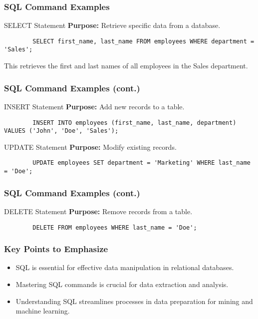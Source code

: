\documentclass[aspectratio=169]{beamer}
\begin{document}
\begin{frame}[fragile]
    \frametitle{SQL Command Examples}
    \begin{block}{SELECT Statement}
        \textbf{Purpose:} Retrieve specific data from a database.
        \begin{lstlisting}
        SELECT first_name, last_name FROM employees WHERE department = 'Sales';
        \end{lstlisting}
        This retrieves the first and last names of all employees in the Sales department.
    \end{block}
\end{frame}

\begin{frame}[fragile]
    \frametitle{SQL Command Examples (cont.)}
    \begin{block}{INSERT Statement}
        \textbf{Purpose:} Add new records to a table.
        \begin{lstlisting}
        INSERT INTO employees (first_name, last_name, department) VALUES ('John', 'Doe', 'Sales');
        \end{lstlisting}
    \end{block}
    \begin{block}{UPDATE Statement}
        \textbf{Purpose:} Modify existing records.
        \begin{lstlisting}
        UPDATE employees SET department = 'Marketing' WHERE last_name = 'Doe';
        \end{lstlisting}
    \end{block}
\end{frame}

\begin{frame}[fragile]
    \frametitle{SQL Command Examples (cont.)}
    \begin{block}{DELETE Statement}
        \textbf{Purpose:} Remove records from a table.
        \begin{lstlisting}
        DELETE FROM employees WHERE last_name = 'Doe';
        \end{lstlisting}
    \end{block}
\end{frame}

\begin{frame}[fragile]
    \frametitle{Key Points to Emphasize}
    \begin{itemize}
        \item SQL is essential for effective data manipulation in relational databases.
        \item Mastering SQL commands is crucial for data extraction and analysis.
        \item Understanding SQL streamlines processes in data preparation for mining and machine learning.
    \end{itemize}
\end{frame}
\end{document}
